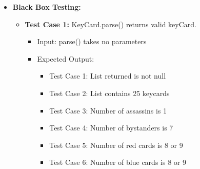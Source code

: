 \documentclass[12pt]{article}
\begin{document}
\begin{itemize}
    \item \textbf{Black Box Testing:}
    \begin{itemize}
        \item \textbf{Test Case 1:} KeyCard.parse() returns valid keyCard.
            \begin{itemize}
            \item Input: parse() takes no parameters
            \item Expected Output: 
            \begin{itemize}
                \item Test Case 1: List returned is not null
                \item Test Case 2: List contains 25 keycards
                \item Test Case 3: Number of assassins is 1
                \item Test Case 4: Number of bystanders is 7
                \item Test Case 5: Number of red cards is 8 or 9
                \item Test Case 6: Number of blue cards is 8 or 9
            \end{itemize}
        \end{itemize}
    \end{itemize}
\end{itemize}




\end{document}
